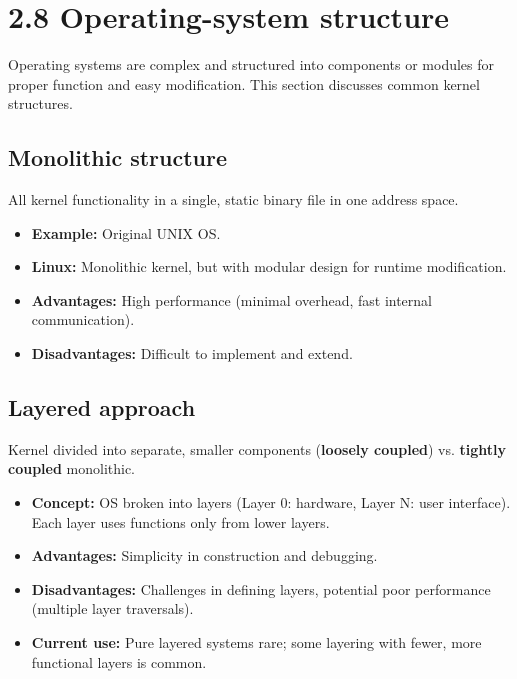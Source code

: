 \section*{2.8 Operating-system structure}

Operating systems are complex and structured into components or modules for proper function and easy modification. This section discusses common kernel structures.

\subsection*{Monolithic structure}
All kernel functionality in a single, static binary file in one address space.
\begin{itemize}
    \item \textbf{Example:} Original UNIX OS.
    \item \textbf{Linux:} Monolithic kernel, but with modular design for runtime modification.
    \item \textbf{Advantages:} High performance (minimal overhead, fast internal communication).
    \item \textbf{Disadvantages:} Difficult to implement and extend.
\end{itemize}

\subsection*{Layered approach}
Kernel divided into separate, smaller components (\textbf{loosely coupled}) vs. \textbf{tightly coupled} monolithic.
\begin{itemize}
    \item \textbf{Concept:} OS broken into layers (Layer 0: hardware, Layer N: user interface). Each layer uses functions only from lower layers.
    \item \textbf{Advantages:} Simplicity in construction and debugging.
    \item \textbf{Disadvantages:} Challenges in defining layers, potential poor performance (multiple layer traversals).
    \item \textbf{Current use:} Pure layered systems rare; some layering with fewer, more functional layers is common.
\end{itemize}

